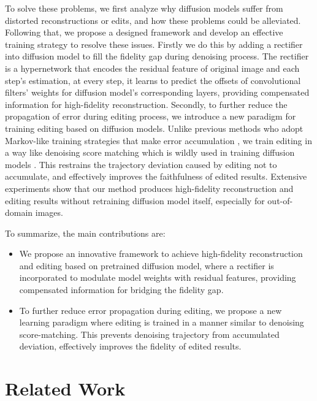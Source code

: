 \documentclass[letterpaper]{article} %
\begin{document}
To solve these problems, we first analyze why diffusion models suffer from distorted reconstructions or edits, and how these problems could be alleviated. Following that, we propose a designed framework and develop an effective training strategy to resolve these issues. Firstly we do this by adding a rectifier into diffusion model to fill the fidelity gap during denoising process. The rectifier is a hypernetwork \cite{david2016hypernetworks} that encodes the residual feature of original image and each step's estimation, at every step, it learns to predict the offsets of convolutional filters' weights for diffusion model's corresponding layers, providing compensated information for high-fidelity reconstruction. Secondly, to further reduce the propagation of error during editing process, we introduce a new paradigm for training editing based on diffusion models. Unlike previous methods who adopt Markov-like training strategies that make error accumulation \cite{kim2022diffusionclip, kwon2022diffusion}, we train editing in a way like denoising score matching \cite{song2020score} which is wildly used in training diffusion models \cite{ho2020denoising, song2020score, lipman2022flow}. This restrains the trajectory deviation caused by editing not to accumulate, and effectively improves the faithfulness of edited results. Extensive experiments show that our method produces high-fidelity reconstruction and editing results without retraining diffusion model itself, especially for out-of-domain images.

To summarize, the main contributions are:
\begin{itemize}
\item We propose an innovative framework to achieve high-fidelity reconstruction and editing based on pretrained diffusion model, where a rectifier is incorporated to modulate model weights with residual features, providing compensated information for bridging the fidelity gap.

\item To further reduce error propagation during editing, we propose a new learning paradigm where editing is trained in a manner similar to denoising score-matching. This prevents denoising trajectory from accumulated deviation, effectively improves the fidelity of edited results.

\end{itemize}

\section{Related Work}
\end{document}
